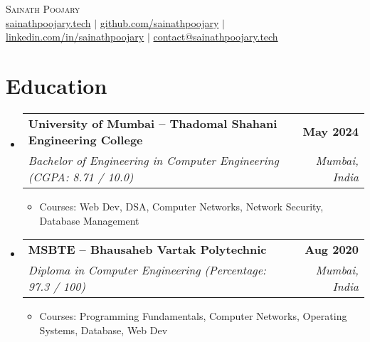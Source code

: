 \documentclass[letterpaper,11pt]{article}
\makeatletter
\newcommand{\resumeItem}[1]{
  \item\small{
    {#1 \vspace{-2pt}}
  }
}
\newcommand{\resumeSubheading}[4]{
  \vspace{-2pt}\item
    \begin{tabular*}{1.0\textwidth}[t]{l@{\extracolsep{\fill}}r}
      \vspace{-2pt}\textbf{#1} & \textbf{\small #2} \\
      \textit{\small#3} & \textit{\small #4} \\
    \end{tabular*}\vspace{-7pt}
}
\newcommand{\resumeSubHeadingListStart}{\begin{itemize}[leftmargin=0.0in, label={}]}
\newcommand{\resumeSubHeadingListEnd}{\end{itemize}}
\newcommand{\resumeItemListStart}{\begin{itemize}}
\newcommand{\resumeItemListEnd}{\end{itemize}\vspace{-5pt}}
\makeatother
\begin{document}




\begin{center}
  {\huge \scshape Sainath Poojary} \\ \vspace{5pt}
  \small
  \href{https://sainathpoojary.tech}{sainathpoojary.tech} $|$ \href{https://github.com/sainathpoojary}{github.com/sainathpoojary} $|$ \href{https://linkedin.com/in/sainathpoojary}{linkedin.com/in/sainathpoojary} $|$ \href{mailto:contact@sainathpoojary.tech}{contact@sainathpoojary.tech}
  \vspace{-8pt}
\end{center}


\section{Education}
\resumeSubHeadingListStart
\resumeSubheading
{University of Mumbai -- Thadomal Shahani Engineering College}{May 2024}
{Bachelor of Engineering in Computer Engineering (CGPA: 8.71 / 10.0)}{Mumbai, India}
\resumeItemListStart
\resumeItem{Courses: Web Dev, DSA, Computer Networks, Network Security, Database Management}
\resumeItemListEnd
\resumeSubHeadingListEnd
\vspace{-5pt}

\resumeSubHeadingListStart
\resumeSubheading
{MSBTE -- Bhausaheb Vartak Polytechnic}{Aug 2020}
{Diploma in Computer Engineering (Percentage: 97.3 / 100)}{Mumbai, India}
\resumeItemListStart
\resumeItem{Courses: Programming Fundamentals, Computer Networks, Operating Systems, Database, Web Dev}
\resumeItemListEnd
\resumeSubHeadingListEnd
\vspace{-15pt}
\end{document}

